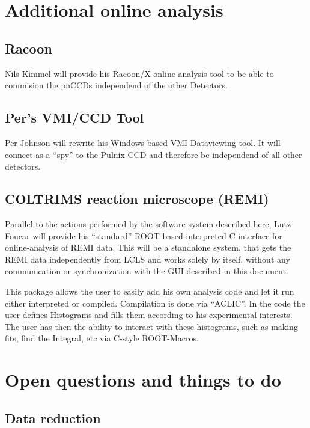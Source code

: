 \documentclass[11pt,a4paper,oneside]{article}
\begin{document}
\section{Additional online analysis}
\label{sec:additional_online_analysis}

\subsection{Racoon}
\label{sec:additional_racoon}

Nils Kimmel will provide his Racoon/X-online analysis tool to be able to commision the pnCCDs independend of the other Detectors.

\subsection{Per's VMI/CCD Tool}
\label{sec:pervmi}

Per Johnson will rewrite his Windows based VMI Dataviewing tool. It will connect as a "`spy"' to the Pulnix CCD and therefore be independend of all other detectors. 

\subsection{COLTRIMS reaction microscope (REMI)}
\label{sec:remi}

Parallel to the actions performed by the software system described here, Lutz Foucar will provide his ``standard'' ROOT-based interpreted-C interface for online-analysis of REMI data. This will be a standalone system, that gets the REMI data independently from LCLS and works solely by itself, without any communication or synchronization with the GUI described in this document.

This package allows the user to easily add his own analysis code and let it run either interpreted or compiled. Compilation is done via ``ACLIC''. In the code the user defines Histograms and fills them according to his experimental interests. The user has then the ability to interact with these histograms, such as making fits, find the Integral, etc via C-style ROOT-Macros.

\clearpage

\section{Open questions and things to do}
\label{sec:open-quest-things}

\subsection{Data reduction}
\label{sec:data-reduction}
\end{document}
